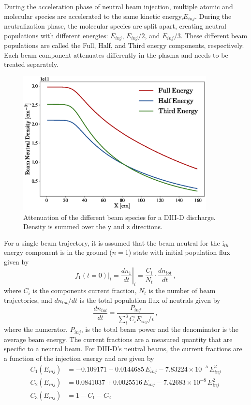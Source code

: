 During the acceleration phase of neutral beam injection, multiple atomic and molecular species are accelerated to the same kinetic energy,$E_{inj}$. During the neutralization phase, the molecular species are split apart, creating neutral populations with different energies: $E_{inj}$, $E_{inj}/2$, and $E_{inj}/3$. These different beam populations are called the Full, Half, and Third energy components, respectively.
Each beam component attenuates differently in the plasma and needs to be treated separately.
\begin{figure}[h!]
    \centering
    \includegraphics[width=10cm]{figures/beam_attenuation.eps}
    \caption{Attenuation of the different beam species for a DIII-D discharge. Density is summed over the y and z directions.}
    \label{fig:beam_attenuation}
\end{figure}
For a single beam trajectory, it is assumed that the beam neutral for the i$_{th}$ energy component is in the ground ($n=1$) state with initial population flux given by
\begin{equation}\label{eq:nb_flux}
    f_1(t=0)|_i = \left. \frac{d n_1}{dt}\right\rvert_i = \frac{C_i}{N_t} \cdot \frac{d n_{tot}}{dt}\,,
\end{equation}
where $C_i$ is the components current fraction, $N_t$ is the number of beam trajectories, and $dn_{tot}/dt$ is the total population flux of neutrals given by
\begin{equation}\label{eq:tot_flux}
    \frac{d n_{tot}}{dt} = \frac{P_{inj}}{\sum_i^3 C_i E_{inj}/i}\,,
\end{equation}
where the numerator, $P_{inj}$, is the total beam power and the denominator is the average beam energy.
The current fractions are a measured quantity that are specific to a neutral beam. For DIII-D's neutral beams, the current fractions are a function of the injection energy and are given by
\begin{equation}\label{eq:d3d_cfracs}
\begin{split}
    C_{1}(E_{inj}) &= -0.109171 + 0.0144685\, E_{inj} - 7.83224\times10^{-5}\, E_{inj}^2 \\
    C_{2}(E_{inj}) &= 0.0841037 + 0.0025516\, E_{inj} - 7.42683\times10^{-8}\, E_{inj}^2 \\
    C_{3}(E_{inj}) &= 1 - C_{1} - C_{2}
\end{split}
\end{equation}

